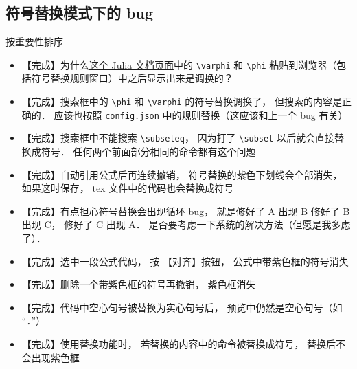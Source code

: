 
\subsection{符号替换模式下的 bug}
按重要性排序
\begin{itemize}

\item 【完成】为什么\href{https://docs.julialang.org/en/v1/manual/unicode-input/}{这个 Julia 文档页面}中的 \lstinline|\varphi| 和 \lstinline|\phi| 粘贴到浏览器（包括符号替换规则窗口）中之后显示出来是调换的？

\item 【完成】搜索框中的 \lstinline|\phi| 和 \lstinline|\varphi| 的符号替换调换了， 但搜索的内容是正确的． 应该也按照 \lstinline|config.json| 中的规则替换（这应该和上一个 bug 有关）

\item 【完成】搜索框中不能搜索 \lstinline|\subseteq|， 因为打了 \lstinline|\subset| 以后就会直接替换成符号． 任何两个前面部分相同的命令都有这个问题

\item 【完成】自动引用公式后再连续撤销， 符号替换的紫色下划线会全部消失， 如果这时保存， tex 文件中的代码也会替换成符号

\item 【完成】有点担心符号替换会出现循环 bug， 就是修好了 A 出现 B 修好了 B 出现 C， 修好了 C 出现 A． 是否要考虑一下系统的解决方法（但愿是我多虑了）．

\item 【完成】选中一段公式代码， 按 【对齐】按钮， 公式中带紫色框的符号消失

\item 【完成】删除一个带紫色框的符号再撤销， 紫色框消失

\item 【完成】代码中空心句号被替换为实心句号后， 预览中仍然是空心句号（如 “．”）

\item 【完成】使用替换功能时， 若替换的内容中的命令被替换成符号， 替换后不会出现紫色框
\end{itemize}

